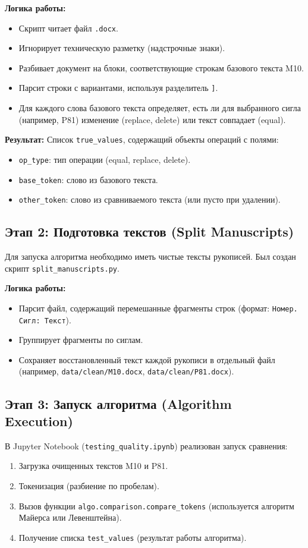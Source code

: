 \documentclass[12pt,a4paper]{article}
\begin{document}
\textbf{Логика работы:}
\begin{itemize}
    \item Скрипт читает файл \texttt{.docx}.
    \item Игнорирует техническую разметку (надстрочные знаки).
    \item Разбивает документ на блоки, соответствующие строкам базового текста M10.
    \item Парсит строки с вариантами, используя разделитель \texttt{]}.
    \item Для каждого слова базового текста определяет, есть ли для выбранного сигла (например, P81) изменение (replace, delete) или текст совпадает (equal).
\end{itemize}

\textbf{Результат:} Список \texttt{true\_values}, содержащий объекты операций с полями:
\begin{itemize}
    \item \texttt{op\_type}: тип операции (equal, replace, delete).
    \item \texttt{base\_token}: слово из базового текста.
    \item \texttt{other\_token}: слово из сравниваемого текста (или пусто при удалении).
\end{itemize}

\subsection{Этап 2: Подготовка текстов (Split Manuscripts)}
Для запуска алгоритма необходимо иметь чистые тексты рукописей. Был создан скрипт \texttt{split\_manuscripts.py}.

\textbf{Логика работы:}
\begin{itemize}
    \item Парсит файл, содержащий перемешанные фрагменты строк (формат: \texttt{Номер. Сигл: Текст}).
    \item Группирует фрагменты по сиглам.
    \item Сохраняет восстановленный текст каждой рукописи в отдельный файл (например, \texttt{data/clean/M10.docx}, \texttt{data/clean/P81.docx}).
\end{itemize}

\subsection{Этап 3: Запуск алгоритма (Algorithm Execution)}
В Jupyter Notebook (\texttt{testing\_quality.ipynb}) реализован запуск сравнения:
\begin{enumerate}
    \item Загрузка очищенных текстов M10 и P81.
    \item Токенизация (разбиение по пробелам).
    \item Вызов функции \texttt{algo.comparison.compare\_tokens} (используется алгоритм Майерса или Левенштейна).
    \item Получение списка \texttt{test\_values} (результат работы алгоритма).
\end{enumerate}
\end{document}
